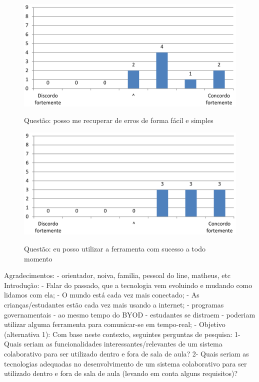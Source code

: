 \begin{figure}[h]
\centering
\caption{Questão: posso me recuperar de erros de forma fácil e simples}
\includegraphics[width=1.0\textwidth]{use/fu_facil_simples.pdf} 
\label{fig:fu_facil_simples} 
\end{figure}


\begin{figure}[h]
\centering
\caption{Questão: eu posso utilizar a ferramenta com sucesso a todo momento}
\includegraphics[width=1.0\textwidth]{use/fu_sucesso.pdf} 
\label{fig:fu_sucesso} 
\end{figure}

\fi





\iffalse
        Agradecimentos: 
            - orientador, noiva, familia, pessoal do line, matheus, etc
        Introdução:
            - Falar do passado, que a tecnologia vem evoluindo e mudando como lidamos com ela;
            - O mundo está cada vez mais conectado;
            - As crianças/estudantes estão cada vez mais usando a internet;
            - programas governamentais 
            - ao mesmo tempo do BYOD
                - estudantes se distraem
                - poderiam utilizar alguma ferramenta para comunicar-se em tempo-real;
            - Objetivo (alternativa 1):
                Com base neste contexto, seguintes perguntas de pesquisa:
                    1- Quais seriam as funcionalidades interessantes/relevantes de um sistema colaborativo para ser utilizado dentro e fora de sala de aula?
                    2- Quais seriam as tecnologias adequadas no desenvolvimento de um sistema colaborativo para ser utilizado dentro e fora de sala de aula (levando em conta alguns requisitos)?

